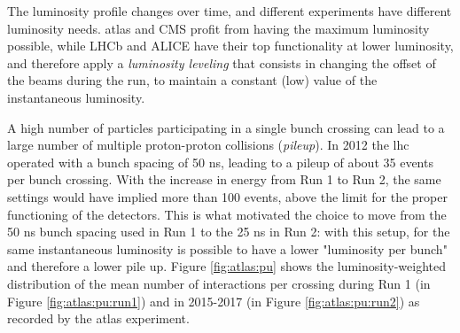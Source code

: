 The luminosity profile changes over time, and different experiments have different luminosity needs. \gls{atlas} and CMS profit from having the maximum luminosity possible, while LHCb and ALICE have their top functionality at lower luminosity, and therefore apply a \textit{luminosity leveling} that consists in changing the offset of the beams during the run, to maintain a constant (low) value of the instantaneous luminosity.

A high number of particles participating in a single bunch crossing can lead to a large number of multiple proton-proton collisions (\textit{pileup}). In 2012 the \gls{lhc} operated with a bunch spacing of 50 ns, leading to a pileup of about 35 events per bunch crossing. With the increase in energy from Run 1 to Run 2, the same settings would have implied more than 100 events, above the limit for the proper functioning of the detectors. This is what motivated the choice to move from the 50 ns bunch spacing used in Run 1 to the 25 ns in Run 2: with this setup, for the same instantaneous luminosity is possible to have a lower "luminosity per bunch" and therefore a lower pile up. Figure \ref{fig:atlas:pu} shows the luminosity-weighted distribution of the mean number of interactions per crossing during Run 1 (in Figure \ref{fig:atlas:pu:run1})
and in 2015-2017 (in Figure \ref{fig:atlas:pu:run2}) as recorded by the \gls{atlas} experiment.

